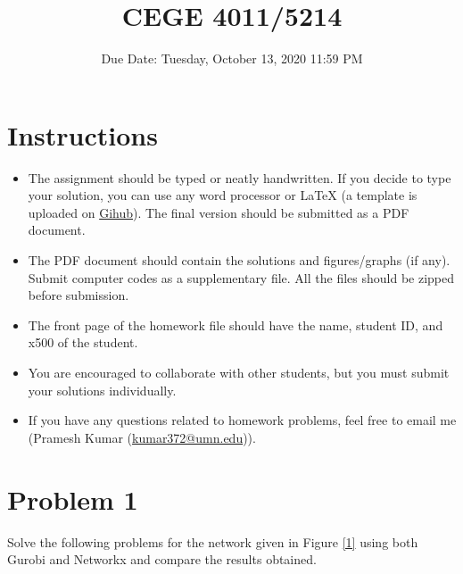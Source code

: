 \documentclass[10pt]{article}
\title{CEGE 4011/5214 \exerciseset}
\date{Due Date: Tuesday, October 13, 2020 11:59 PM}
\begin{document}
\maketitle
\section*{Instructions}
\begin{itemize}
	\setlength\itemsep{0em}
	\item The assignment should be typed or neatly handwritten. If you decide to type your solution, you can use any word processor or LaTeX (a template is uploaded on \href{https://github.com/prameshk/UMN-HW-template}{Gihub}). The final version should be submitted as a PDF document. 
	\item The PDF document should contain the solutions and figures/graphs (if any). Submit computer codes as a supplementary file. All the files should be zipped before submission.
	\item The front page of the homework file should have the name, student ID, and x500 of the student.
	\item You are encouraged to collaborate with other students, but you must submit your solutions individually.
	\item If you have any questions related to homework problems, feel free to email me (Pramesh Kumar (\href{mailto:kumar372@umn.edu}{kumar372@umn.edu})). 
\end{itemize}

\section*{Problem 1}
	Solve the following problems for the network given in Figure \ref{1} using both Gurobi and Networkx and compare the results obtained.
	
\end{document}
